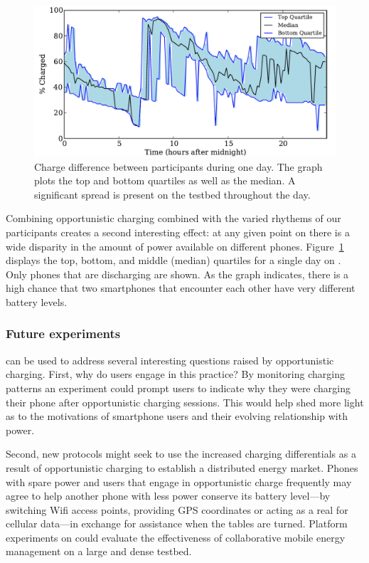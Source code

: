 \begin{figure}[t]
\includegraphics[width=\textwidth]{./figures/power/opportunistic_charging/max_difference/graph.pdf}
\caption{Charge difference between participants during one day.
\textnormal{The graph plots the top and bottom quartiles as well as the
median. A significant spread is present on the testbed throughout the day.}}
\label{fig-opportunisticspread}
\end{figure}

Combining opportunistic charging combined with the varied rhythems of our
participants creates a second interesting effect: at any given point on
\PhoneLab{} there is a wide disparity in the amount of power available on
different phones. Figure~\ref{fig-opportunisticspread} displays the top,
bottom, and middle (median) quartiles for a single day on \PhoneLab{}. Only
phones that are discharging are shown. As the graph indicates, there is a
high chance that two smartphones that encounter each other have very
different battery levels.

\subsubsection{Future experiments}

\PhoneLab{} can be used to address several interesting questions raised by
opportunistic charging. First, why do users engage in this practice? By
monitoring charging patterns an experiment could prompt users to indicate why
they were charging their phone after opportunistic charging sessions. This
would help shed more light as to the motivations of smartphone users and
their evolving relationship with power.

Second, new protocols might seek to use the increased charging differentials
as a result of opportunistic charging to establish a distributed energy
market. Phones with spare power and users that engage in opportunistic charge
frequently may agree to help another phone with less power conserve its
battery level---by switching Wifi access points, providing GPS coordinates or
acting as a real for cellular data---in exchange for assistance when the
tables are turned. Platform experiments on \PhoneLab{} could evaluate the
effectiveness of collaborative mobile energy management on a large and dense
testbed.

